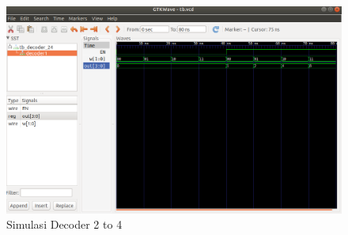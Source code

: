 \documentclass{class}
\begin{document}
\begin{enumerate}
\begin{figure}[H]
            \includegraphics[width=1\linewidth]{gambar/simlasi_24.png}
            \caption{Simulasi Decoder 2 to 4}
            \label{decoder24}
            \end{figure}
    \end{enumerate}
\end{document}
